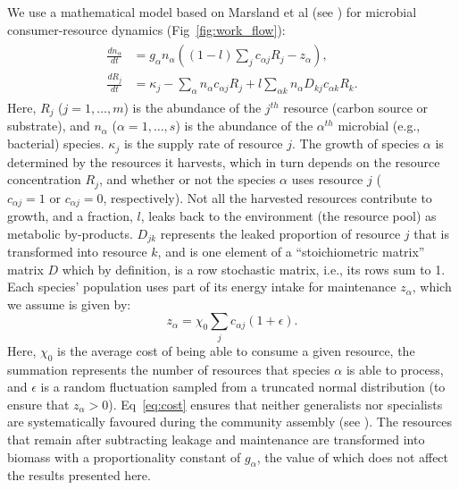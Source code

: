 \documentclass[10pt,letterpaper]{article}
\begin{document}
We use a mathematical model based on Marsland et al \cite{Marsland2019} (see ) for microbial consumer-resource dynamics (Fig~\ref{fig:work_flow}):
\begin{align}
\begin{split}
    \frac{dn_\alpha }{dt} &= g_\alpha n_\alpha \left((1-l)\sum_j c_{\alpha j}R_j - z_\alpha \right),  \\
    \frac{dR_{j}}{dt} &= \kappa_j - \sum_\alpha n_\alpha c_{\alpha j}R_j + l\sum_{\alpha k}n_\alpha D_{kj}c_{\alpha k}R_k. 
    \end{split}
\label{eq:Model}
\end{align}
Here, $R_j$ ($j  = 1, \dots, m$) is the abundance of the $j^{th}$ resource (carbon source or substrate), and $ n_\alpha$ ($\alpha  = 1, \dots, s$) is the abundance of the $\alpha^{th}$ microbial (e.g., bacterial) species. $ \kappa_j $ is the supply rate of resource  $ j $. The growth of species $ \alpha $ is determined by the resources it harvests, which in turn depends on the resource concentration $ R_j $, and whether or not the species $ \alpha  $ uses resource $ j $ ($ c_{\alpha j} = 1 \text{ or } c_{\alpha j} = 0 $, respectively). Not all the harvested resources contribute to growth, and a fraction, $l$, leaks back to the environment (the resource pool) as metabolic by-products. $ D_{jk} $ represents the leaked proportion of resource $ j $ that is transformed into resource $ k $, and is one element of a ``stoichiometric matrix'' matrix $D$ which by definition, is a row stochastic matrix, i.e., its rows sum to 1. Each species' population uses part of its energy intake for maintenance $ z_\alpha  $, which we assume is given by:
\begin{equation}\label{eq:cost}
    z_\alpha  = \chi_0\sum_j c_{\alpha j} (1 + \epsilon).
\end{equation}
Here, $\chi_0$ is the average cost of being able to consume a given resource, the summation represents the number of resources that species $\alpha$ is able to process, and $\epsilon$ is a random fluctuation sampled from a truncated normal distribution (to ensure that $z_\alpha  > 0$). Eq~\ref{eq:cost} ensures that neither generalists nor specialists are systematically favoured during the community assembly (see ). The resources that remain after subtracting leakage and maintenance are transformed into biomass with a proportionality constant of $ g_\alpha  $, the value of which does not affect the results presented here.
\end{document}
